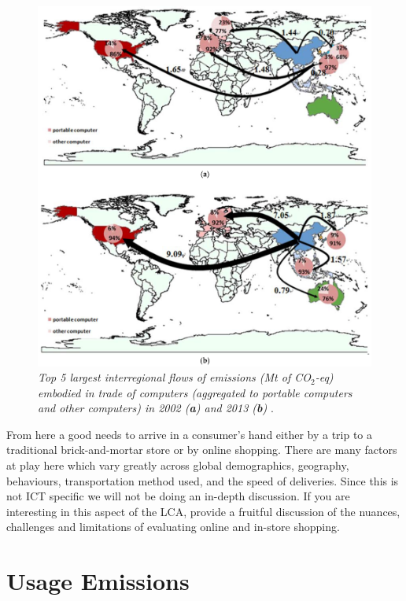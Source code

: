 \documentclass{article}
\begin{document}
\begin{figure}[h]
    \includegraphics[width=.85 \textwidth]{./images/transport_global_computers.png}
    \centering
    \caption{\textit{Top 5 largest interregional flows of emissions (Mt of CO$_2$-eq) embodied in trade of computers (aggregated to portable computers and other computers) in 2002 (\textbf{a}) and 2013 (\textbf{b})} \cite{lee2018greenhouse}.}
    \label{transport_global_computers}
\end{figure}

From here a good needs to arrive in a consumer's hand either by a trip to a traditional brick-and-mortar store or by online shopping. There are many factors at play here which vary greatly across global demographics, geography, behaviours, transportation method used, and the speed of deliveries. Since this is not ICT specific we will not be doing an in-depth discussion. If you are interesting in this aspect of the LCA, \cite{carling2015measuring, jaller2020evaluating, brown2014carbon} provide a fruitful discussion of the nuances, challenges and limitations of evaluating online and in-store shopping.


\cleardoublepage
\section{Usage Emissions} \label{SECTION_USAGE_EMISSION}
\end{document}
